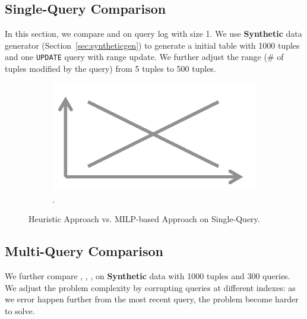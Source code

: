 {\color{blue}
\subsection{Single-Query Comparison}
In this section, we compare \heurstic and \milpall on query log with size 1. 
We use \textbf{Synthetic} data generator (Section~\ref{sec:syntheticgen}) 
to generate a initial table with 1000 tuples and one 
\texttt{UPDATE} query with range update. 
We further adjust the range (\# of tuples modified by the query) 
from 5 tuples to 500 tuples. 

 \begin{figure}[h]
\centering
  \begin{subfigure}[t]{.48\columnwidth}
  \includegraphics[width = .95\columnwidth]{figures/placeholder}
  \caption{.}
  \label{f:heursticvsmilp} 
  \end{subfigure}
  \caption{Heuristic Approach vs. MILP-based Approach on Single-Query. }
\end{figure}

\subsection{Multi-Query Comparison}
We further compare \milpall, \milptuple, \milptuplestopearly, \milpadvtuple  
on \textbf{Synthetic} data 
with 1000 tuples and 300 queries. We adjust the problem complexity by corrupting queries 
at different indexes: as we error happen further from the most recent query, 
the problem become harder to solve. 

}
